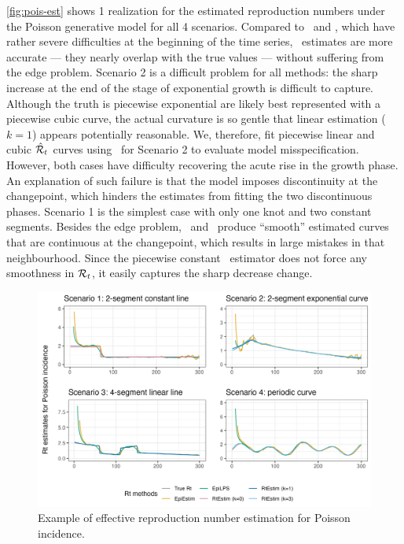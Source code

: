 \autoref{fig:pois-est} shows 1 realization for the estimated reproduction
numbers under the Poisson generative model for all 4 scenarios. Compared to
\EpiEstim\ and \EpiLPS, which have rather severe difficulties at the beginning
of the time series, \RtEstim\ estimates are more accurate --- they nearly overlap
with the true values --- without suffering from the edge problem. Scenario 2 is a
difficult problem for all methods: the sharp increase at the end of the stage of
exponential growth is difficult to capture. Although the truth is piecewise
exponential are likely best represented with a piecewise cubic curve, the actual
curvature is so gentle that linear estimation ($k=1$) appears potentially
reasonable. We, therefore, fit piecewise linear and cubic $\hat{\mathcal{R}}_t$ curves
using \RtEstim\ for Scenario 2 to evaluate model misspecification. However, both
cases have difficulty recovering the acute rise in the growth phase. An
explanation of such failure is that the model imposes discontinuity at the
changepoint, which hinders the estimates from fitting the two discontinuous
phases. Scenario 1 is the simplest case with only one knot and two constant
segments. Besides the edge problem, \EpiEstim\ and \EpiLPS\ produce ``smooth''
estimated curves that are continuous at the changepoint, which results in
large mistakes in that neighbourhood. Since the
piecewise constant \RtEstim\ estimator does not force any smoothness in
$\mathcal{R}_t$, it easily captures the sharp decrease change. 

\begin{figure}[tb]
    \centering
    \includegraphics[width=.99\textwidth]{fig/Pois-res-plot.png}
    \caption{Example of effective reproduction number estimation for Poisson incidence.}
    \label{fig:pois-est}
\end{figure}


